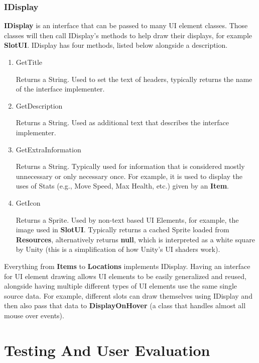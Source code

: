 \documentclass{report}
\begin{document}
\subsection{IDisplay}

\textbf{IDisplay} is an interface that can be passed to many UI element classes. Those classes will then call IDisplay's methods to help draw their displays, for example \textbf{SlotUI}. IDisplay has four methods, listed below alongside a description.

\begin{enumerate}

	\item GetTitle

Returns a String. Used to set the text of headers, typically returns the name of the interface implementer.

	\item GetDescription

Returns a String. Used as additional text that describes the interface implementer.

	\item GetExtraInformation

Returns a String. Typically used for information that is considered mostly unnecessary or only necessary once. For example, it is used to display the uses of Stats (e.g., Move Speed, Max Health, etc.) given by an \textbf{Item}.

	\item GetIcon

Returns a Sprite. Used by non-text based UI Elements, for example, the image used in \textbf{SlotUI}. Typically returns a cached Sprite loaded from \textbf{Resources}, alternatively returns \textbf{null}, which is interpreted as a white square by Unity (this is a simplification of how Unity's UI shaders work).

\end{enumerate}

Everything from \textbf{Items} to \textbf{Locations} implements IDisplay. Having an interface for UI element drawing allows UI elements to be easily generalized and reused, alongside having multiple different types of UI elements use the same single source data. For example, different slots can draw themselves using IDisplay and then also pass that data to \textbf{DisplayOnHover} (a class that handles almost all mouse over events). 

\chapter{Testing And User Evaluation}
\end{document}
